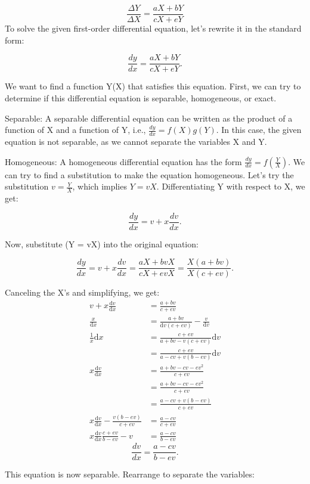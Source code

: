 \documentclass{article}
\newcommand\di[1]{\text{d}#1}
\begin{document}
  \[\frac{\Delta{Y}}{\Delta{X}} = \frac{aX + bY}{cX + eY}\]
  To solve the given first-order differential equation, let's rewrite it in the standard form:

\[\frac{dy}{dx} = \frac{aX + bY}{cX + eY}.\]

We want to find a function Y(X) that satisfies this equation. First, we can try to determine if this differential equation is separable, homogeneous, or exact.

Separable: A separable differential equation can be written as the product of a function of X and a function of Y, i.e., \(\frac{dy}{dx}=f(X)g(Y)\). In this case, the given equation is not separable, as we cannot separate the variables X and Y.

Homogeneous: A homogeneous differential equation has the form \( \frac{dy}{dx}=f(\frac{Y}{X})\). We can try to find a substitution to make the equation homogeneous. Let's try the substitution \(v=\frac{Y}{X}\), which implies \(Y=vX\). Differentiating Y with respect to X, we get:

\[\frac{dy}{dx}=v + x\frac{dv}{dx}.\]

Now, substitute (Y = vX) into the original equation:

\[\frac{dy}{dx} =v + x\frac{dv}{dx} = \frac{aX + bvX}{cX + evX} = \frac{X(a+bv)}{X(c+ev)}.\]

Canceling the X's and simplifying, we get:
\begin{align*}
  v + x\frac{\di{v}}{\di{x}} &= \frac{a + bv}{c + ev} \\
  \frac{x}{\di{x}} &= \frac{a + bv}{\di{v}(c + ev)} - \frac{v}{\di{v}} \\
  \frac{1}{x}\di{x} &= \frac{c + ev}{a + bv - v(c + ev)} \di{v} \\
  &= \frac{c + ev}{a - cv + v(b - ev)} \di{v}\\
  x\frac{\di{v}}{\di{x}} &= \frac{a + bv - cv - ev^2}{c + ev} \\
  &= \frac{a + bv - cv - ev^2}{c + ev} \\
  &= \frac{a - cv + v(b- ev)}{c + ev} \\
  x\frac{\di{v}}{\di{x}} - \frac{v(b- ev)}{c + ev} &= \frac{a - cv}{c + ev} \\
  x\frac{\di{v}}{\di{x}} \frac{c + ev}{b - ev} - v &= \frac{a - cv}{b - ev} 
\end{align*}
\[\frac{dv}{dx} = \frac{a - cv}{b - ev}.\]

This equation is now separable. Rearrange to separate the variables:
\end{document}
